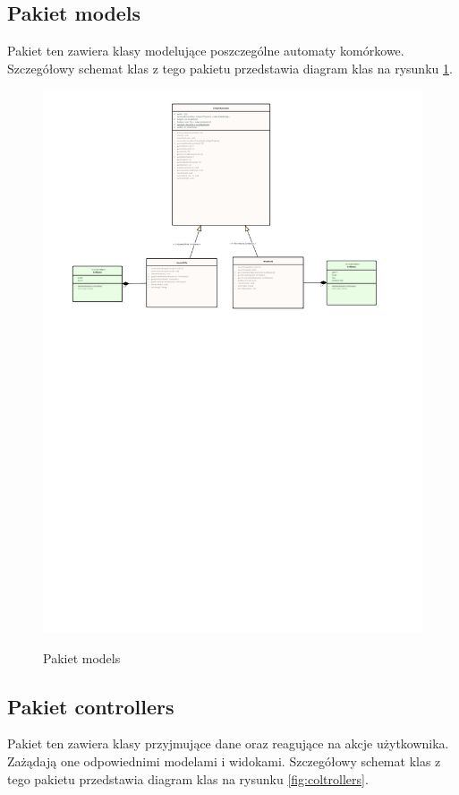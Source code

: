 \documentclass{report}
\begin{document}
\subsection{Pakiet models}
Pakiet ten zawiera klasy modelujące poszczególne automaty komórkowe.
Szczegółowy schemat klas z tego pakietu przedstawia diagram klas na rysunku \ref{fig:models}.

\begin{figure}
	\centering
	\caption{Pakiet models}
	\hspace*{-3cm}\includegraphics[width=18cm]{Pakiet_models}
	\label{fig:models}
\end{figure}

\subsection{Pakiet controllers}
Pakiet ten zawiera klasy przyjmujące dane oraz reagujące na akcje użytkownika. Zażądają one odpowiednimi modelami i widokami.
Szczegółowy schemat klas z tego pakietu przedstawia diagram klas na rysunku \ref{fig:coltrollers}.
\end{document}
